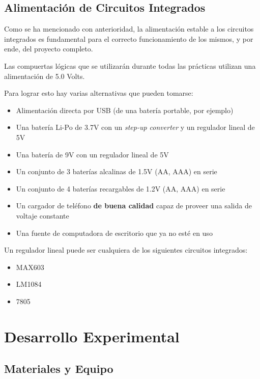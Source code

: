\subsection{Alimentación de Circuitos Integrados}
Como se ha mencionado con anterioridad, la alimentación estable a los circuitos integrados es fundamental para el correcto funcionamiento de los mismos, y por ende, del proyecto completo.

Las compuertas lógicas que se utilizarán durante todas las prácticas utilizan una alimentación de 5.0 Volts.

Para lograr esto hay varias alternativas que pueden tomarse:
\begin{itemize}
    \item Alimentación directa por USB (de una batería portable, por ejemplo)
    \item Una batería Li-Po de 3.7V con un \emph{step-up converter} y un regulador lineal de 5V
    \item Una batería de 9V con un regulador lineal de 5V
    \item Un conjunto de 3 baterías alcalinas de 1.5V (AA, AAA) en serie
    \item Un conjunto de 4 baterías recargables de 1.2V (AA, AAA) en serie
    \item Un cargador de teléfono \textbf{de buena calidad} capaz de proveer una salida de voltaje constante
    \item Una fuente de computadora de escritorio que ya no esté en uso
\end{itemize}

\vspace{20pt}

Un regulador lineal puede ser cualquiera de los siguientes circuitos integrados:
\begin{itemize}
    \item MAX603
    \item LM1084
    \item 7805
\end{itemize}

\pagebreak

\section{Desarrollo Experimental}
\subsection{Materiales y Equipo}

